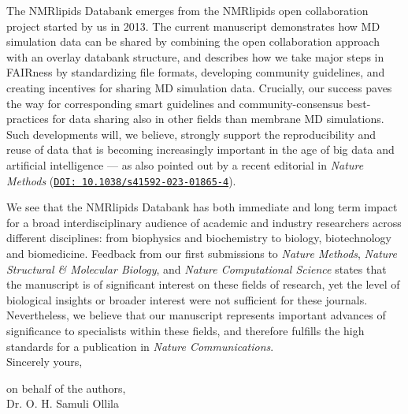 \documentclass[11pt]{letter}
\begin{document}

The NMRlipids Databank emerges from the NMRlipids open collaboration project started by us in 2013.
The current manuscript demonstrates how MD simulation data can be shared by combining the open collaboration approach with an overlay databank structure, and describes how we take major steps in FAIRness by standardizing file formats, developing community guidelines, and creating incentives for sharing MD simulation data. Crucially, our success paves the way for corresponding smart guidelines and community-consensus best-practices for data sharing also in other fields than membrane MD simulations.
Such developments will, we believe, strongly support the reproducibility and reuse of data that is becoming increasingly important in the age of big data and artificial intelligence --- as also pointed out by a recent editorial in \textit{Nature Methods} (\href{https://doi.org/10.1038/s41592-023-01865-4}{\tt DOI: 10.1038/s41592-023-01865-4}). 

We see that the NMRlipids Databank has both immediate and long term impact for a broad interdisciplinary audience of academic and industry researchers across different disciplines: from biophysics and biochemistry to biology, biotechnology and biomedicine. Feedback from our first submissions to \textit{Nature Methods}, \textit{Nature Structural \& Molecular Biology}, and \textit{Nature Computational Science} states that the manuscript is of significant interest on these fields of research, yet the level of biological insights or broader interest were not sufficient for these journals. Nevertheless, we believe that our manuscript represents important advances of significance to specialists within these fields, and therefore fulfills the high standards for a publication in \textit{ Nature Communications}. \\




Sincerely yours,

on behalf of the authors,\\

Dr. O. H. Samuli Ollila
\end{document}
